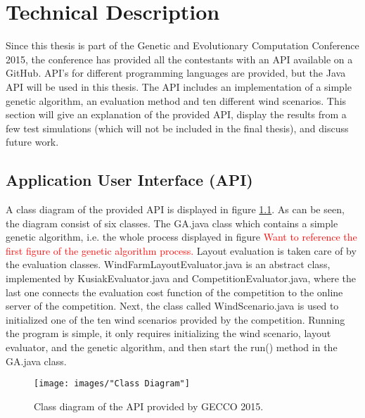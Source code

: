 \chapter{Technical Description}


Since this thesis is part of the Genetic and Evolutionary Computation Conference 2015, the conference has provided all the contestants with an API available on a GitHub. API's for different programming languages are provided, but the Java API will be used in this thesis. The API includes an implementation of a simple genetic algorithm, an evaluation method and ten different wind scenarios. This section will give an explanation of the provided API, display the results from a few test simulations (which will not be included in the final thesis), and discuss future work.


\section{Application User Interface (API)}
A class diagram of the provided API is displayed in figure \ref{Class Diagram}. As can be seen, the diagram consist of six classes. The GA.java class which contains a simple genetic algorithm, i.e. the whole process displayed in figure \textcolor{red}{Want to reference the first figure of the genetic algorithm process.} Layout evaluation is taken care of by the evaluation classes. WindFarmLayoutEvaluator.java is an abstract class, implemented by KusiakEvaluator.java and CompetitionEvaluator.java, where the last one connects the evaluation cost function of the competition to the online server of the competition. Next, the class called WindScenario.java is used to initialized one of the ten wind scenarios provided by the competition. Running the program is simple, it only requires initializing the wind scenario, layout evaluator, and the genetic algorithm, and then start the run() method in the GA.java class.


\begin{figure}[h!]
\begin{center}
\texttt{[image: images/"Class Diagram"]}
\caption{Class diagram of the API provided by GECCO 2015.}
\label{Class Diagram}
\end{center}
\end{figure}


